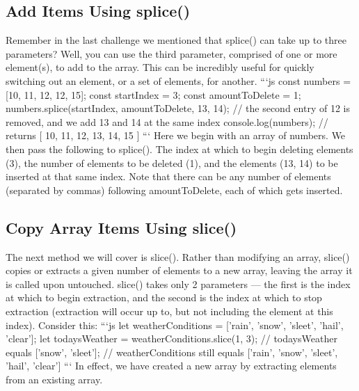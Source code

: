 \documentclass{article}%
\begin{document}
\subsection{Add Items Using splice()}%
\label{subsec:AddItemsUsingsplice()}%
Remember in the last challenge we mentioned that splice() can take up to three parameters? Well, you can use the third parameter, comprised of one or more element(s), to add to the array. This can be incredibly useful for quickly switching out an element, or a set of elements, for another.\newline%
```js\newline%
const numbers = {[}10, 11, 12, 12, 15{]};\newline%
const startIndex = 3;\newline%
const amountToDelete = 1;\newline%
numbers.splice(startIndex, amountToDelete, 13, 14);\newline%
// the second entry of 12 is removed, and we add 13 and 14 at the same index\newline%
console.log(numbers);\newline%
// returns {[} 10, 11, 12, 13, 14, 15 {]}\newline%
```\newline%
Here we begin with an array of numbers. We then pass the following to splice(). The index at which to begin deleting elements (3), the number of elements to be deleted (1), and the elements (13, 14) to be inserted at that same index. Note that there can be any number of elements (separated by commas) following amountToDelete, each of which gets inserted.\newline%

%
\subsection{Copy Array Items Using slice()}%
\label{subsec:CopyArrayItemsUsingslice()}%
The next method we will cover is slice(). Rather than modifying an array, slice() copies or extracts a given number of elements to a new array, leaving the array it is called upon untouched. slice() takes only 2 parameters — the first is the index at which to begin extraction, and the second is the index at which to stop extraction (extraction will occur up to, but not including the element at this index). Consider this:\newline%
```js\newline%
let weatherConditions = {[}'rain', 'snow', 'sleet', 'hail', 'clear'{]};\newline%
let todaysWeather = weatherConditions.slice(1, 3);\newline%
// todaysWeather equals {[}'snow', 'sleet'{]};\newline%
// weatherConditions still equals {[}'rain', 'snow', 'sleet', 'hail', 'clear'{]}\newline%
```\newline%
In effect, we have created a new array by extracting elements from an existing array.\newline%
\end{document}
